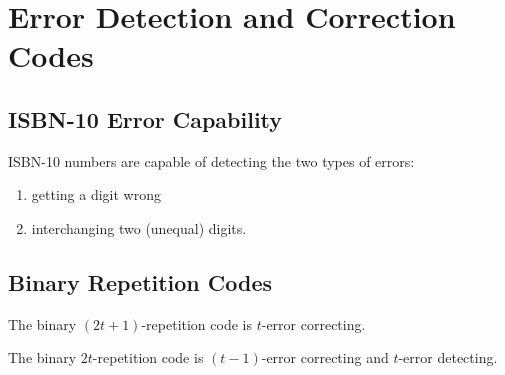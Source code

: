 \section{Error Detection and Correction Codes}

\subsection{ISBN-10 Error Capability}
ISBN-10 numbers are capable of detecting the two types of errors:
\begin{enumerate}
    \item getting a digit wrong
    \item interchanging two (unequal) digits.
\end{enumerate}

\subsection{Binary Repetition Codes}
The binary \((2t + 1)\)-repetition code is \(t\)-error correcting.

The binary \(2t\)-repetition code is \((t- 1)\)-error correcting and \(t\)-error detecting.
